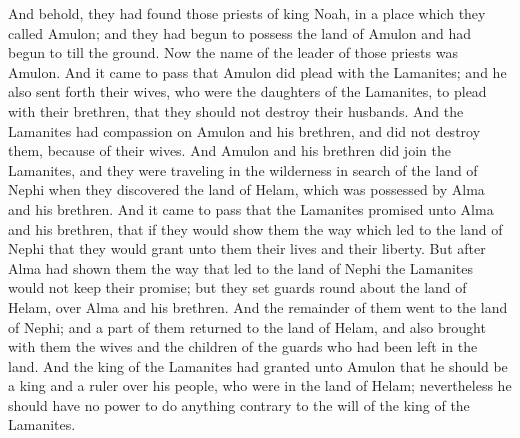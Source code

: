 And behold, they had found those priests of king Noah, in a place which they called Amulon; and they had begun to possess the land of Amulon and had begun to till the ground.
\bverse \iffalse Now the name of the leader of those priests was Amulon. \fi
Now the name of the leader of those priests was Amulon.
\bverse \iffalse And it came to pass that Amulon did plead with the Lamanites; and he also sent forth their wives, who were the daughters of the Lamanites, to plead with their brethren, that they should not destroy their husbands. \fi
And it came to pass that Amulon did plead with the Lamanites; and he also sent forth their wives, who were the daughters of the Lamanites, to plead with their brethren, that they should not destroy their husbands.
\bverse \iffalse And the Lamanites had compassion on Amulon and his brethren, and did not destroy them, because of their wives. \fi
And the Lamanites had compassion on Amulon and his brethren, and did not destroy them, because of their wives.
\bverse \iffalse And Amulon and his brethren did join the Lamanites, and they were traveling in the wilderness in search of the land of Nephi when they discovered the land of Helam, which was possessed by Alma and his brethren. \fi
And Amulon and his brethren did join the Lamanites, and they were traveling in the wilderness in search of the land of Nephi when they discovered the land of Helam, which was possessed by Alma and his brethren.
\bverse \iffalse And it came to pass that the Lamanites promised unto Alma and his brethren, that if they would show them the way which led to the land of Nephi that they would grant unto them their lives and their liberty. \fi
And it came to pass that the Lamanites promised unto Alma and his brethren, that if they would show them the way which led to the land of Nephi that they would grant unto them their lives and their liberty.
\bverse \iffalse But after Alma had shown them the way that led to the land of Nephi the Lamanites would not keep their promise; but they set guards round about the land of Helam, over Alma and his brethren. \fi
But after Alma had shown them the way that led to the land of Nephi the Lamanites would not keep their promise; but they set guards round about the land of Helam, over Alma and his brethren.
\bverse \iffalse And the remainder of them went to the land of Nephi; and a part of them returned to the land of Helam, and also brought with them the wives and the children of the guards who had been left in the land. \fi
And the remainder of them went to the land of Nephi; and a part of them returned to the land of Helam, and also brought with them the wives and the children of the guards who had been left in the land.
\bverse \iffalse And the king of the Lamanites had granted unto Amulon that he should be a king and a ruler over his people, who were in the land of Helam; nevertheless he should have no power to do anything contrary to the will of the king of the Lamanites. \fi
And the king of the Lamanites had granted unto Amulon that he should be a king and a ruler over his people, who were in the land of Helam; nevertheless he should have no power to do anything contrary to the will of the king of the Lamanites.

